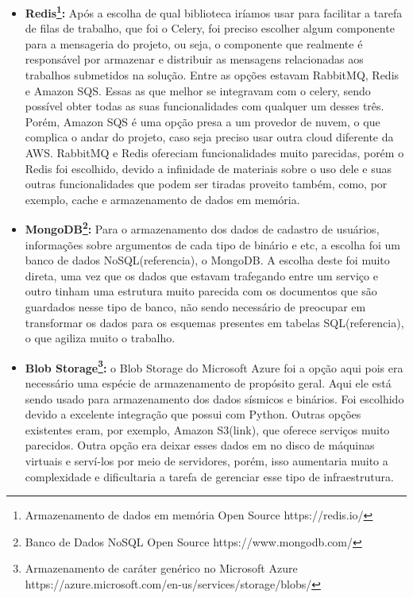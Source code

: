 \documentclass[11pt,twoside]{article}
\begin{document}
\begin{itemize}
  \item \textbf{Redis\footnote{Armazenamento de dados em memória Open Source https://redis.io/}:} Após a escolha de qual biblioteca iríamos usar para facilitar a tarefa de filas de trabalho, que foi o Celery, foi preciso escolher algum componente para a mensageria do projeto, ou seja, o
  componente que realmente é responsável por armazenar e distribuir as mensagens relacionadas aos trabalhos submetidos na solução. Entre as opções estavam RabbitMQ, Redis e Amazon SQS. Essas as que melhor se 
  integravam com o celery, sendo possível obter todas as suas funcionalidades com qualquer um desses três. Porém, Amazon SQS é uma opção presa a um provedor de nuvem, o que complica o andar do projeto, caso seja 
  preciso usar outra cloud diferente da AWS. RabbitMQ e Redis ofereciam funcionalidades muito parecidas, porém o Redis foi escolhido, devido a infinidade de materiais sobre o uso dele e suas outras funcionalidades
  que podem ser tiradas proveito também, como, por exemplo, cache e armazenamento de dados em memória.

  \item \textbf{MongoDB\footnote{Banco de Dados NoSQL Open Source https://www.mongodb.com/}:} Para o armazenamento dos dados de cadastro de usuários, informações sobre argumentos de cada tipo de binário e etc, a escolha foi um banco de dados NoSQL(referencia), o MongoDB. A escolha deste
  foi muito direta, uma vez que os dados que estavam trafegando entre um serviço e outro tinham uma estrutura muito parecida com os documentos que são guardados nesse tipo de banco, não sendo necessário de preocupar
  em transformar os dados para os esquemas presentes em tabelas SQL(referencia), o que agiliza muito o trabalho.

  \item \textbf{Blob Storage\footnote{Armazenamento de caráter genérico no Microsoft Azure https://azure.microsoft.com/en-us/services/storage/blobs/}:} o Blob Storage do Microsoft Azure foi a opção aqui pois era necessário uma espécie de armazenamento de propósito geral. Aqui ele está sendo usado para armazenamento dos dados sísmicos e
  binários. Foi escolhido devido a excelente integração que possui com Python. Outras opções existentes eram, por exemplo, Amazon S3(link), que oferece serviços muito parecidos. Outra opção era deixar esses dados em 
  no disco de máquinas virtuais e serví-los por meio de servidores, porém, isso aumentaria muito a complexidade e dificultaria a tarefa de gerenciar esse tipo de infraestrutura.
\end{itemize}
\end{document}
